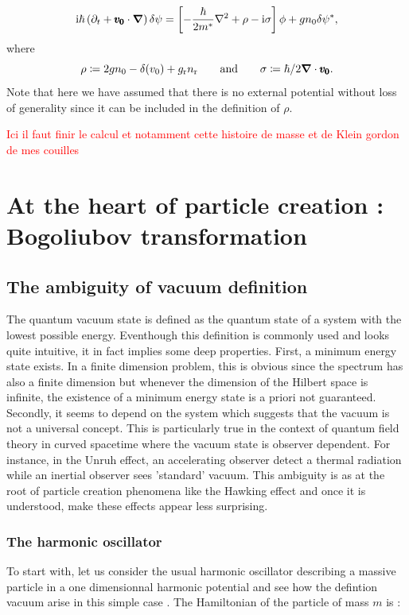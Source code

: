 \begin{equation}
    \mathrm{i} \hbar \left(\partial_t+\pmb{v_0}\cdot{\boldsymbol{\nabla}}\right)\delta\psi=\left[-\frac{\hbar}{2m^*}\nabla^2+\rho-\mathrm{i}\sigma\right]\phi+g n_0 \delta\psi^*,
        \label{eq:DefPertGPE}
\end{equation}
where $$\rho\coloneqq2g n_0- \delta(v_0)+g_{\rm r}n_{\rm r}\qquad\text{and}\qquad\sigma\coloneqq\hbar/2\boldsymbol{\nabla} \cdot\pmb{v_0}.$$
Note that here we have assumed that there is no external potential without loss of generality since it can be included in the definition of $\rho$.

\textcolor{red}{Ici il faut finir le calcul et notamment cette histoire de masse et de Klein gordon de mes couilles}

\section{At the heart of particle creation : Bogoliubov transformation}

\subsection{The ambiguity of vacuum definition}
The quantum vacuum state is defined as the quantum state of a system with the lowest possible energy. Eventhough 
this definition is commonly used and looks quite intuitive, it in fact implies some deep properties. First, a minimum energy state exists. In a finite dimension
problem, this is obvious since the spectrum has also a finite dimension but whenever the dimension of the Hilbert space is infinite, the existence of a minimum energy state is a priori not guaranteed.
Secondly, it seems to depend on the system which suggests that the vacuum is not a universal concept. This is particularly true in the context of quantum field theory in curved spacetime where the vacuum state is observer dependent.
For instance, in the Unruh effect, an accelerating observer detect a thermal radiation while an inertial observer sees 'standard' vacuum. This ambiguity is
as at the root of particle creation phenomena like the Hawking effect and once it is understood, make these effects appear less surprising.


\subsubsection{The harmonic oscillator}

To start with, let us consider the usual harmonic oscillator describing a massive particle in a one dimensionnal harmonic potential and
see how the defintion vacuum arise in this simple case \cite{CCT_tome1}. The Hamiltonian of the particle of mass $m$ is :



